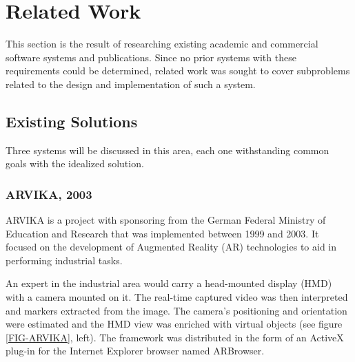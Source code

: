\section{Related Work}

This section is the result of researching existing academic and commercial software systems and publications.
Since no prior systems with these requirements could be determined, related work was sought to cover subproblems
related to the design and implementation of such a system.



\subsection{Existing Solutions}



Three systems will be discussed in this area, each one 
withstanding common goals with the idealized solution.


\subsubsection{ARVIKA, 2003}


ARVIKA \cite{ARVIKA} is a project with sponsoring from the
German Federal Ministry of Education and Research that was implemented between 1999 and 2003.
It focused on the development of Augmented Reality (AR) technologies to aid in performing industrial tasks.

An expert in the industrial area would carry a head-mounted display (HMD) with a camera mounted on it.
The real-time captured video was then interpreted and markers extracted from the image.
The camera's positioning and orientation were estimated and the HMD view was enriched with virtual objects
(see figure \ref{FIG-ARVIKA}, left).
The framework was distributed in the form of an ActiveX plug-in for the Internet Explorer browser
named ARBrowser.

